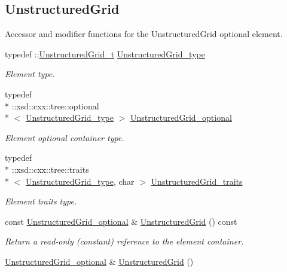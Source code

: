 \subsection*{Unstructured\+Grid}
\label{_amgrp51267337395fceec37fec7e87b9a53e5}%
Accessor and modifier functions for the Unstructured\+Grid optional element. \begin{DoxyCompactItemize}
\item 
typedef \+::\hyperlink{classUnstructuredGrid__t}{Unstructured\+Grid\+\_\+t} \hyperlink{classVTKFile__t_a34ea02f6804e701657f11a8dc3851951}{Unstructured\+Grid\+\_\+type}
\begin{DoxyCompactList}\small\item\em Element type. \end{DoxyCompactList}\item 
typedef \\*
\+::xsd\+::cxx\+::tree\+::optional\\*
$<$ \hyperlink{classVTKFile__t_a34ea02f6804e701657f11a8dc3851951}{Unstructured\+Grid\+\_\+type} $>$ \hyperlink{classVTKFile__t_ada5bb5a706e03ef1ab2ed1513ea83833}{Unstructured\+Grid\+\_\+optional}
\begin{DoxyCompactList}\small\item\em Element optional container type. \end{DoxyCompactList}\item 
typedef \\*
\+::xsd\+::cxx\+::tree\+::traits\\*
$<$ \hyperlink{classVTKFile__t_a34ea02f6804e701657f11a8dc3851951}{Unstructured\+Grid\+\_\+type}, char $>$ \hyperlink{classVTKFile__t_a02772a5f713678f02e94188d6a552528}{Unstructured\+Grid\+\_\+traits}
\begin{DoxyCompactList}\small\item\em Element traits type. \end{DoxyCompactList}\item 
const \hyperlink{classVTKFile__t_ada5bb5a706e03ef1ab2ed1513ea83833}{Unstructured\+Grid\+\_\+optional} \& \hyperlink{classVTKFile__t_a118852d8ec1f8039d1fd5c914282351a}{Unstructured\+Grid} () const 
\begin{DoxyCompactList}\small\item\em Return a read-\/only (constant) reference to the element container. \end{DoxyCompactList}\item 
\hyperlink{classVTKFile__t_ada5bb5a706e03ef1ab2ed1513ea83833}{Unstructured\+Grid\+\_\+optional} \& \hyperlink{classVTKFile__t_aa4746d4a723076d4643b8ef16a9c3890}{Unstructured\+Grid} ()

\end{DoxyCompactItemize}
